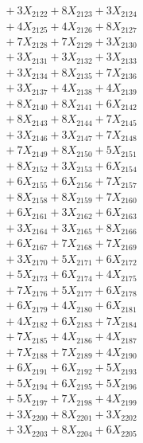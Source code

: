 \documentclass[a4paper,10pt]{article}
\begin{document}
{\begin{align}
&\;  + 3 X_{2122} + 8 X_{2123} + 3 X_{2124} \\[0.3ex]
&\;  + 4 X_{2125} + 4 X_{2126} + 8 X_{2127} \\[0.3ex]
&\;  + 7 X_{2128} + 7 X_{2129} + 3 X_{2130} \\[0.3ex]
&\;  + 3 X_{2131} + 3 X_{2132} + 3 X_{2133} \\[0.3ex]
&\;  + 3 X_{2134} + 8 X_{2135} + 7 X_{2136} \\[0.3ex]
&\;  + 3 X_{2137} + 4 X_{2138} + 4 X_{2139} \\[0.5ex]\allowbreak
&\;  + 8 X_{2140} + 8 X_{2141} + 6 X_{2142} \\[0.3ex]
&\;  + 8 X_{2143} + 8 X_{2144} + 7 X_{2145} \\[0.3ex]
&\;  + 3 X_{2146} + 3 X_{2147} + 7 X_{2148} \\[0.3ex]
&\;  + 7 X_{2149} + 8 X_{2150} + 5 X_{2151} \\[0.3ex]
&\;  + 8 X_{2152} + 3 X_{2153} + 6 X_{2154} \\[0.3ex]
&\;  + 6 X_{2155} + 6 X_{2156} + 7 X_{2157} \\[0.3ex]
&\;  + 8 X_{2158} + 8 X_{2159} + 7 X_{2160} \\[0.3ex]
&\;  + 6 X_{2161} + 3 X_{2162} + 6 X_{2163} \\[0.3ex]
&\;  + 3 X_{2164} + 3 X_{2165} + 8 X_{2166} \\[0.3ex]
&\;  + 6 X_{2167} + 7 X_{2168} + 7 X_{2169} \\[0.5ex]\allowbreak
&\;  + 3 X_{2170} + 5 X_{2171} + 6 X_{2172} \\[0.3ex]
&\;  + 5 X_{2173} + 6 X_{2174} + 4 X_{2175} \\[0.3ex]
&\;  + 7 X_{2176} + 5 X_{2177} + 6 X_{2178} \\[0.3ex]
&\;  + 6 X_{2179} + 4 X_{2180} + 6 X_{2181} \\[0.3ex]
&\;  + 4 X_{2182} + 6 X_{2183} + 7 X_{2184} \\[0.3ex]
&\;  + 7 X_{2185} + 4 X_{2186} + 4 X_{2187} \\[0.3ex]
&\;  + 7 X_{2188} + 7 X_{2189} + 4 X_{2190} \\[0.3ex]
&\;  + 6 X_{2191} + 6 X_{2192} + 5 X_{2193} \\[0.3ex]
&\;  + 5 X_{2194} + 6 X_{2195} + 5 X_{2196} \\[0.3ex]
&\;  + 5 X_{2197} + 7 X_{2198} + 4 X_{2199} \\[0.5ex]\allowbreak
&\;  + 3 X_{2200} + 8 X_{2201} + 3 X_{2202} \\[0.3ex]
&\;  + 3 X_{2203} + 8 X_{2204} + 6 X_{2205} \\[0.3ex]

\end{align}}
\end{document}
